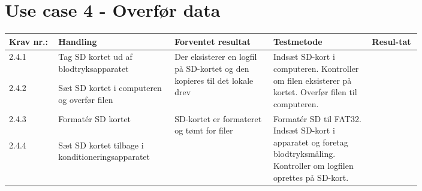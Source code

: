 \section{Use case 4 - Overfør data}
				\begin{longtable}{|p{0.1\linewidth}|p{0.2\linewidth}|p{0.2\linewidth}|p{0.2\linewidth}|p{0.1\linewidth}|}
							\hline
							\rowcolor{usDef}
							Krav nr.: & Handling & Forventet resultat & Testmetode & Resul-tat  \\\hline
							2.4.1 & Tag SD kortet ud af blodtryksapparatet  & \multirow{2}{\linewidth}{Der eksisterer en logfil på SD-kortet og den kopieres til det lokale drev}& \multirow{2}{\linewidth}{Indsæt SD-kort i computeren. Kontroller om filen eksisterer på kortet. Overfør filen til computeren.}& \multirow{2}{\linewidth}{} \\ [2cm]\cline{1-2}
							2.4.2 & Sæt SD kortet i computeren og overfør filen & & & \\ \hline
							2.4.3 & Formatér SD kortet & \multirow{2}{\linewidth}{SD-kortet er formateret og tømt for filer} & \multirow{2}{\linewidth}{Formatér SD til FAT32. Indsæt SD-kort i apparatet og foretag blodtryksmåling. Kontroller om logfilen oprettes på SD-kort. } & \multirow{2}{\linewidth}{}\\ [3cm]\cline{1-2}
							2.4.4 & Sæt SD kortet tilbage i konditioneringsapparatet & & & \\ \hline
				\end{longtable}
